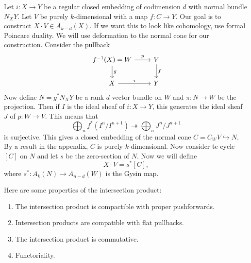 \documentclass[leqno, openany]{memoir}
\theoremstyle{definition}
\theoremstyle{remark}
\theoremstyle{plain}
\theoremstyle{definition}
\theoremstyle{remark}
\begin{document}
Let $i \colon X \to Y$ be a regular closed embedding of codimension $d$ with normal bundle $N_X Y$. Let $V$ be purely $k$-dimensional with a map $f \colon C \to Y$. Our goal is to construct $X \cdot V \in A_{k-d}(X)$. If we want this to look like cohomology, use formal Poincare duality. We will use deformation to the normal cone for our construction. Consider the pullback 
\begin{equation*}
\begin{tikzcd}
    f^{-1}(X) = W \ar{d}{g} \ar{r}{p} & V \ar{d}{f} \\
    X \ar{r}{i} & Y
\end{tikzcd}
\end{equation*}
Now define $N = g^* N_X Y$ be a rank $d$ vector bundle on $W$ and $\pi \colon N \to W$ be the projection. Then if $I$ is the ideal sheaf of $i \colon X \to Y$, this generates the ideal sheaf $J$ of $p \colon W \to V$. This means that
\[ \bigoplus_n f^* (I^n / I^{n+1}) \twoheadrightarrow \bigoplus_n J^n / J^{n+1} \]
is surjective. This gives a closed embedding of the normal cone $C = C_W V \hookrightarrow N$. By a result in the appendix, $C$ is purely $k$-dimensional. Now consider te cycle $[C]$ on $N$ and let $s$ be the zero-section of $N$. Now we will define 
\[ X \cdot V = s^* [C], \]
where $s^* \colon A_k (N) \to A_{n-d}(W)$ is the Gysin map.

Here are some properties of the intersection product:
\begin{enumerate}
    \item The intersection product is compactible with proper pushforwards.
    \item Intersection products are compatible with flat pullbacks.
    \item The intersection product is commutative.
    \item Functoriality.
\end{enumerate}
\end{document}

